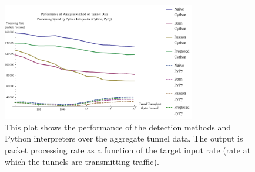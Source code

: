 \documentclass{llncs}
\begin{document}
\begin{figure}[h]
\centering
\includegraphics[width=0.75\textwidth]{../figures/pmat.pdf}
\caption[Performance of Analysis Method and Python Interpreter on Aggregate
Tunnel Data]{This plot shows the performance of the detection methods and Python
interpreters over the aggregate tunnel data. The output is packet processing
rate as a function of the target input rate (rate at which the tunnels are
transmitting traffic). 
}
\label{pmat}
\end{figure}



\end{document}
